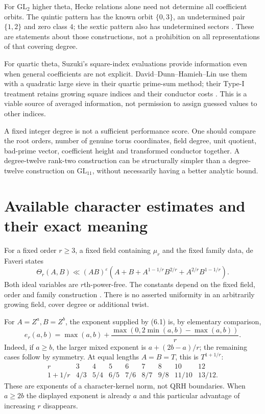 \documentclass[11pt]{article}
\newcommand{\GL}{\mathrm{GL}}
\newcommand{\eps}{\varepsilon}
\begin{document}
For $\GL_2$ higher theta, Hecke relations alone need not determine all
coefficient orbits. The quintic pattern has the known orbit
$\{0,3\}$, an undetermined pair $\{1,2\}$ and zero class $4$;
the sextic pattern also has undetermined sectors
\cite{BrokerHoffstein}. These are statements about those constructions,
not a prohibition on all representations of that covering degree.

For quartic theta, Suzuki's square-index evaluations provide information
even when general coefficients are not explicit. David--Dunn--Hamieh--Lin
use them with a quadratic large sieve in their quartic prime-sum method;
their Type-I treatment retains growing square indices and their
conductor costs \cite{DDHL}. This is a viable source of averaged
information, not permission to assign guessed values to other indices.

A fixed integer degree is not a sufficient performance score. One should
compare the root orders, number of genuine torus coordinates, field
degree, unit quotient, bad-prime vector, coefficient height and
transformed conductor together. A degree-twelve rank-two construction
can be structurally simpler than a degree-twelve construction on
$\GL_{11}$, without necessarily having a better analytic bound.

\section{Available character estimates and their exact meaning}

For a fixed order $r\ge3$, a fixed field containing $\mu_r$ and the
fixed family data, de Faveri states
\[
 \Theta_r(A,B)\ll (AB)^\eps
 \left(A+B+A^{1-1/r}B^{2/r}+A^{2/r}B^{1-1/r}\right).
 \tag{6.1}
\]
Both ideal variables are $r$th-power-free. The constants depend on the
fixed field, order and family construction \cite[Theorem 1.1]{deFaveri}.
There is no asserted uniformity in an arbitrarily growing field,
cover degree or additional twist.

For $A=Z^a,B=Z^b$, the exponent supplied by (6.1) is, by elementary
comparison,
\[
 e_r(a,b)=\max(a,b)+
 \frac{\max(0,2\min(a,b)-\max(a,b))}{r}.
 \tag{6.2}
\]
Indeed, if $a\ge b$, the larger mixed exponent is
$a+(2b-a)/r$; the remaining cases follow by symmetry.
At equal lengths $A=B=T$, this is $T^{1+1/r}$:
\[
\begin{array}{c|rrrrrrrr}
r&3&4&5&6&7&8&10&12\\ \hline
1+1/r&4/3&5/4&6/5&7/6&8/7&9/8&11/10&13/12 .
\end{array}
\]
These are exponents of a character-kernel norm, not QRH boundaries.
When $a\ge2b$ the displayed exponent is already $a$ and this particular
advantage of increasing $r$ disappears.
\end{document}
